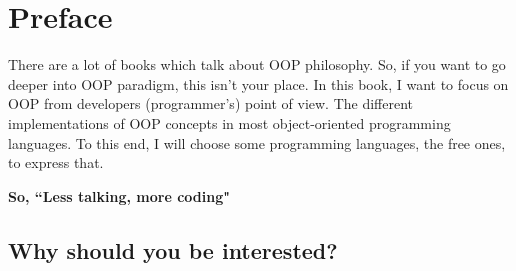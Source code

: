 \documentclass[12pt]{book}
\begin{document}
	\chapter*{Preface}
\fi

{
\merienda

There are a lot of books which talk about OOP philosophy.
So, if you want to go deeper into OOP paradigm, this isn't your place.
In this book, I want to focus on OOP from developers (programmer's) point of view.
The different implementations of OOP concepts in most object-oriented programming languages.
To this end, I will choose some programming languages, the free ones, to express that.


}
\vfill
\begin{flushright}
	\LARGE\bfseries
So, ``Less talking, more coding"
\end{flushright}

\newpage

\section*{Why should you be interested?}
\end{document}
